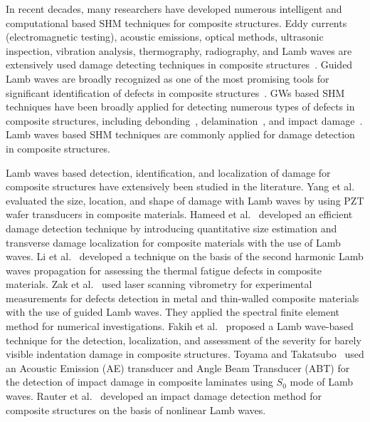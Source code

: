 \documentclass[b5paper, 11pt, titlepage]{book}
\begin{document}
In recent decades, many researchers have developed numerous intelligent and computational based SHM techniques for composite structures. Eddy currents (electromagnetic testing), acoustic emissions, optical methods, ultrasonic inspection, vibration analysis, thermography, radiography, and Lamb waves are extensively used damage detecting techniques in composite structures~\cite{Rahul2018}. Guided Lamb waves are broadly recognized as one of the most promising tools for significant identification of defects in composite structures~\cite{stepinski2013advanced,Ricci2016}. GWs based SHM techniques have been broadly applied for detecting numerous types of defects in composite structures, including debonding~\cite{Sikdar2019}, delamination~\cite{Tian2015,Park2014}, and impact damage~\cite{Girolamo2018,Rogge2013,Kudela2018}. Lamb waves based SHM techniques are commonly applied for damage detection in composite structures. 

Lamb waves based detection, identification, and localization of damage for composite structures have extensively been studied in the literature. Yang et al.~\cite{Yang2019} evaluated the size, location, and shape of damage with Lamb waves by using PZT wafer transducers in composite materials. Hameed et al.~\cite{Hameed2019b} developed an efficient damage detection technique by introducing quantitative size estimation and transverse damage localization for composite materials with the use of Lamb waves. Li et al.~\cite{Li2012} developed a technique on the basis of the second harmonic Lamb waves propagation for assessing the thermal fatigue defects in composite materials. Zak et al.~\cite{Zak2012} used laser scanning vibrometry for experimental measurements for defects detection in metal and thin-walled composite materials with the use of guided Lamb waves. They applied the spectral finite element method for numerical investigations. Fakih et al.~\cite{Fakih2019} proposed a Lamb wave-based technique for the detection, localization, and assessment of the severity for barely visible indentation damage in composite structures. Toyama and Takatsubo~\cite{Toyama2004} used an Acoustic Emission (AE) transducer and Angle Beam Transducer (ABT) for the detection of impact damage in composite laminates using $S_0$ mode of Lamb waves. Rauter et al.~\cite{Rauter2015} developed an impact damage detection method for composite structures on the basis of nonlinear Lamb waves.
\end{document}
